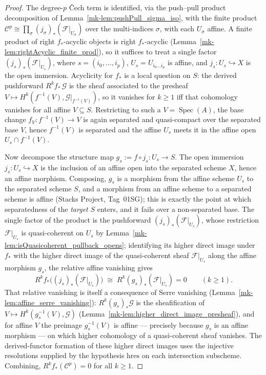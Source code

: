 \begin{proof}
  The degree-\(p\) {\v C}ech term is identified, via the push--pull product decomposition
  of Lemma~\ref{mk-lem:pushPull_sigma_iso}, with the finite product
  \(\mathcal{C}^p \cong \prod_{\sigma} (j_\sigma)_*(\mathcal{F}|_{U_\sigma})\) over the
  multi-indices \(\sigma\), with each \(U_\sigma\) affine. A finite product of right
  \(f_*\)-acyclic objects is right \(f_*\)-acyclic
  (Lemma~\ref{mk-lem:rightAcyclic_finite_prod}), so it suffices to treat a single factor
  \((j_s)_*(\mathcal{F}|_{U_s})\), where \(s = (i_0, \ldots, i_p)\), \(U_s =
  U_{i_0 \ldots i_p}\) is affine, and \(j_s : U_s \hookrightarrow X\) is the open
  immersion. Acyclicity for \(f_*\) is a local question on \(S\): the derived
  pushforward \(R^k f_*\, \mathcal{G}\) is the sheaf associated to the presheaf
  \(V \mapsto H^k(f^{-1}(V), \mathcal{G}|_{f^{-1}(V)})\), so it vanishes for
  \(k \geq 1\) iff that cohomology vanishes for all affine \(V \subseteq S\).
  Restricting to such a \(V = \operatorname{Spec}(A)\), the base change \(f_V :
  f^{-1}(V) \to V\) is again separated and quasi-compact over the separated base
  \(V\), hence \(f^{-1}(V)\) is separated and the affine \(U_s\) meets it in the
  affine open \(U_s \cap f^{-1}(V)\).

  Now decompose the structure map \(g_s := f \circ j_s : U_s \to S\). The open
  immersion \(j_s : U_s \hookrightarrow X\) is the inclusion of an affine open into
  the separated scheme \(X\), hence an affine morphism. Composing, \(g_s\) is a
  morphism from the affine scheme \(U_s\) to the separated scheme \(S\), and a
  morphism from an affine scheme to a separated scheme is affine (Stacks Project,
  Tag~01SG); this is exactly the point at which separatedness of the \emph{target}
  \(S\) enters, and it fails over a non-separated base. The single factor of the
  product is the pushforward \((j_s)_*(\mathcal{F}|_{U_s})\), whose restriction
  \(\mathcal{F}|_{U_s}\) is quasi-coherent on \(U_s\) by
  Lemma~\ref{mk-lem:isQuasicoherent_pullback_opens}; identifying its higher direct
  image under \(f_*\) with the higher direct image of the quasi-coherent sheaf
  \(\mathcal{F}|_{U_s}\) along the affine morphism \(g_s\), the relative affine
  vanishing gives
  \[
    R^k f_*\bigl((j_s)_*(\mathcal{F}|_{U_s})\bigr)
      \;\cong\;
    R^k (g_s)_*(\mathcal{F}|_{U_s}) = 0
      \qquad (k \geq 1).
  \]
  That relative vanishing is itself a consequence of Serre vanishing
  (Lemma~\ref{mk-lem:affine_serre_vanishing}): \(R^k(g_s)_*\mathcal{G}\) is the
  sheafification of \(V \mapsto H^k(g_s^{-1}(V), \mathcal{G})\)
  (Lemma~\ref{mk-lem:higher_direct_image_presheaf}), and for affine \(V\) the preimage
  \(g_s^{-1}(V)\) is affine --- precisely because \(g_s\) is an affine morphism ---
  on which higher cohomology of a quasi-coherent sheaf vanishes. The derived-functor
  formation of these higher direct images uses the injective resolutions supplied by
  the hypothesis \(\mathrm{hres}\) on each intersection subscheme. Combining,
  \(R^k f_*(\mathcal{C}^p) = 0\) for all \(k \geq 1\).
\end{proof}

